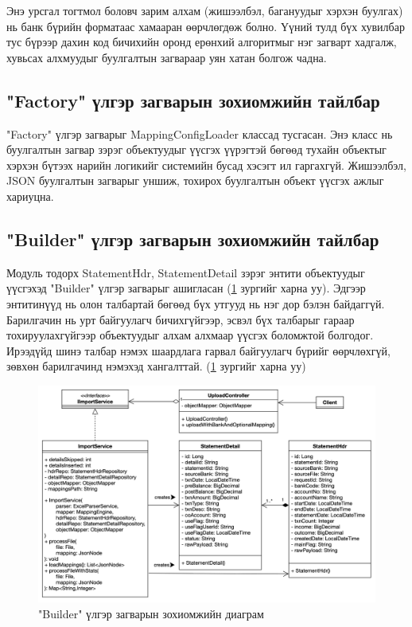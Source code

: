 Энэ урсгал тогтмол боловч зарим алхам (жишээлбэл, багануудыг хэрхэн буулгах) нь банк бүрийн форматаас хамааран өөрчлөгдөж болно. Үүний тулд бүх хувилбар тус бүрээр дахин код бичихийн оронд ерөнхий алгоритмыг нэг загварт хадгалж, хувьсах алхмуудыг буулгалтын загвараар уян хатан болгож чадна. 

\subsection{"Factory" үлгэр загварын зохиомжийн тайлбар}

"Factory" үлгэр загварыг MappingConfigLoader классад тусгасан. Энэ класс нь буулгалтын загвар зэрэг объектуудыг үүсгэх үүрэгтэй бөгөөд тухайн объектыг хэрхэн бүтээх нарийн логикийг системийн бусад хэсэгт ил гаргахгүй. Жишээлбэл, JSON буулгалтын загварыг уншиж, тохирох буулгалтын объект үүсгэх ажлыг хариуцна.

\subsection{"Builder" үлгэр загварын зохиомжийн тайлбар}

Модуль тодорх StatementHdr, StatementDetail зэрэг энтити объектуудыг үүсгэхэд "Builder" үлгэр загварыг ашигласан (\ref{fig:builder} зургийг харна уу). Эдгээр энтитинүүд нь олон талбартай бөгөөд бүх утгууд нь нэг дор бэлэн байдаггүй. Барилгачин нь урт байгуулагч бичихгүйгээр, эсвэл бүх талбарыг гараар тохируулахгүйгээр объектуудыг алхам алхмаар үүсгэх боломжтой болгодог. Ирээдүйд шинэ талбар нэмэх шаардлага гарвал байгуулагч бүрийг өөрчлөхгүй, зөвхөн барилгачинд нэмэхэд хангалттай. (\ref{fig:builder} зургийг харна уу)
\begin{figure}[h]
		\centering
		\includegraphics[width=15cm]{images/builder.png}
		\caption{"Builder" үлгэр загварын зохиомжийн диаграм}
		\label{fig:builder}
\end{figure}
